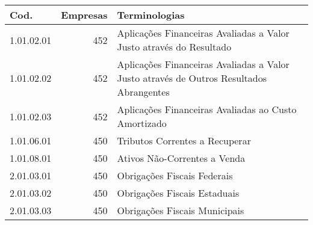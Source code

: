 \begin{table}[ht]
\centering
\begin{tabular}{lrl}
  \hline
Cod. & Empresas & Terminologias \\ 
  \hline
1.01.02.01 & 452 & Aplicações Financeiras Avaliadas a Valor Justo através do Resultado \\ 
  1.01.02.02 & 452 & Aplicações Financeiras Avaliadas a Valor Justo através de Outros Resultados Abrangentes \\ 
  1.01.02.03 & 452 & Aplicações Financeiras Avaliadas ao Custo Amortizado \\ 
  1.01.06.01 & 450 & Tributos Correntes a Recuperar \\ 
  1.01.08.01 & 450 & Ativos Não-Correntes a Venda \\ 
  2.01.03.01 & 450 & Obrigações Fiscais Federais \\ 
  2.01.03.02 & 450 & Obrigações Fiscais Estaduais \\ 
  2.01.03.03 & 450 & Obrigações Fiscais Municipais \\ 
   \hline
\end{tabular}
\end{table}
